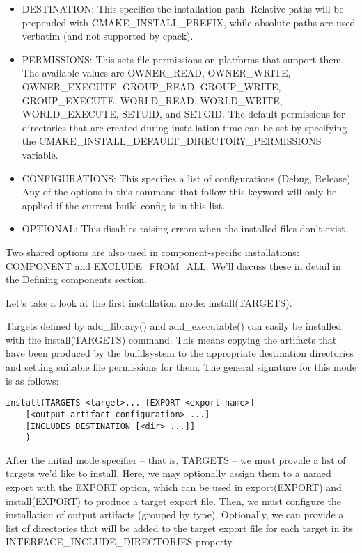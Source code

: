 \begin{itemize}
\item 
DESTINATION: This specifies the installation path. Relative paths will be prepended with CMAKE\_INSTALL\_PREFIX, while absolute paths are used verbatim (and not supported by cpack).

\item 
PERMISSIONS: This sets file permissions on platforms that support them. The available values are OWNER\_READ, OWNER\_WRITE, OWNER\_EXECUTE, GROUP\_READ, GROUP\_WRITE, GROUP\_EXECUTE, WORLD\_READ, WORLD\_WRITE, WORLD\_EXECUTE, SETUID, and SETGID. The default permissions for directories that are created during installation time can be set by specifying the CMAKE\_INSTALL\_DEFAULT\_DIRECTORY\_PERMISSIONS variable.

\item 
CONFIGURATIONS: This specifies a list of configurations (Debug, Release). Any of the options in this command that follow this keyword will only be applied if the current build config is in this list.

\item 
OPTIONAL: This disables raising errors when the installed files don't exist.
\end{itemize}

Two shared options are also used in component-specific installations: COMPONENT and EXCLUDE\_FROM\_ALL. We'll discuss these in detail in the Defining components section.

Let's take a look at the first installation mode: install(TARGETS).


Targets defined by add\_library() and add\_executable() can easily be installed with the install(TARGETS) command. This means copying the artifacts that have been produced by the buildsystem to the appropriate destination directories and setting suitable file permissions for them. The general signature for this mode is as follows:

\begin{lstlisting}[style=styleCMake]
install(TARGETS <target>... [EXPORT <export-name>]
	[<output-artifact-configuration> ...]
	[INCLUDES DESTINATION [<dir> ...]]
	)
\end{lstlisting}

After the initial mode specifier – that is, TARGETS – we must provide a list of targets we'd like to install. Here, we may optionally assign them to a named export with the EXPORT option, which can be used in export(EXPORT) and install(EXPORT) to produce a target export file. Then, we must configure the installation of output artifacts (grouped by type). Optionally, we can provide a list of directories that will be added to the target export file for each target in its INTERFACE\_INCLUDE\_DIRECTORIES property.

